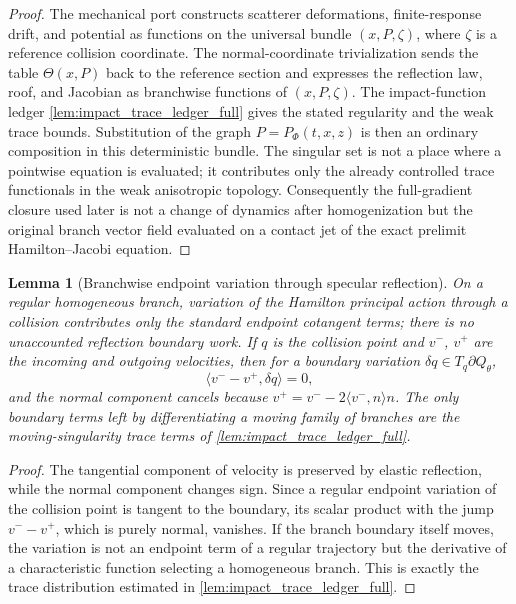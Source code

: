 \documentclass[12pt, letterpaper]{amsart}
\theoremstyle{plain}
\newtheorem{lemma}[theorem]{Lemma}
\theoremstyle{definition}
\theoremstyle{remark}
\begin{document}
\begin{proof}
The mechanical port constructs scatterer deformations, finite-response drift,
and potential as functions on the universal bundle
\((x,P,\zeta)\), where \(\zeta\) is a reference collision coordinate.  The
normal-coordinate trivialization sends the table \(\Theta(x,P)\) back to the
reference section and expresses the reflection law, roof, and Jacobian as
branchwise functions of \((x,P,\zeta)\).  The impact-function ledger
\cref{lem:impact_trace_ledger_full} gives the stated regularity and the weak
trace bounds.  Substitution of the graph \(P=P_\Phi(t,x,z)\) is then an
ordinary composition in this deterministic bundle.  The singular set is not a
place where a pointwise equation is evaluated; it contributes only the already
controlled trace functionals in the weak anisotropic topology.  Consequently
the full-gradient closure used later is not a change of dynamics after
homogenization but the original branch vector field evaluated on a contact jet
of the exact prelimit Hamilton--Jacobi equation.
\end{proof}

\begin{lemma}[Branchwise endpoint variation through specular reflection]
\label{lem:branchwise_endpoint_variation_specular}
On a regular homogeneous branch, variation of the Hamilton principal action
through a collision contributes only the standard endpoint cotangent terms;
there is no unaccounted reflection boundary work.  If \(q\) is the collision
point and \(v^-\), \(v^+\) are the incoming and outgoing velocities, then for a
boundary variation \(\delta q\in T_q\partial Q_\theta\),
\begin{equation}
    \langle v^- - v^+,\delta q\rangle=0,
\end{equation}
and the normal component cancels because \(v^+=v^- -2\langle v^-,n\rangle n\).
The only boundary terms left by differentiating a moving family of branches are
the moving-singularity trace terms of \cref{lem:impact_trace_ledger_full}.
\end{lemma}

\begin{proof}
The tangential component of velocity is preserved by elastic reflection, while
the normal component changes sign.  Since a regular endpoint variation of the
collision point is tangent to the boundary, its scalar product with the jump
\(v^- -v^+\), which is purely normal, vanishes.  If the branch boundary itself
moves, the variation is not an endpoint term of a regular trajectory but the
derivative of a characteristic function selecting a homogeneous branch.  This
is exactly the trace distribution estimated in \cref{lem:impact_trace_ledger_full}.
\end{proof}
\end{document}
